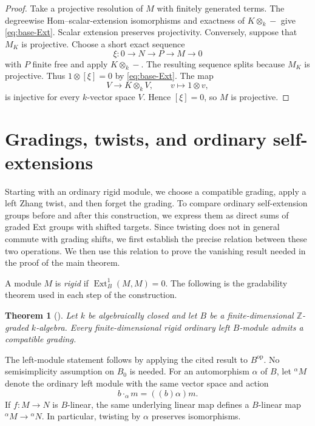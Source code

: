 \documentclass[11pt,a4paper]{article}
\numberwithin{equation}{section}
\theoremstyle{definition}
\theoremstyle{plain}
\newtheorem{theorem}[definition]{Theorem}
\theoremstyle{remark}
\DeclareMathOperator{\Ext}{Ext}
\newcommand{\Z}{\mathbb Z}
\newcommand{\tw}[2]{{}^{#1}\!#2}
\begin{document}
\begin{proof}
Take a projective resolution of \(M\) with finitely generated terms.
The degreewise Hom--scalar-extension isomorphisms and exactness of
\(K\otimes_k-\) give \eqref{eq:base-Ext}. Scalar extension preserves
projectivity. Conversely, suppose that \(M_K\) is projective.
Choose a short exact sequence
\[
 \xi:0\longrightarrow N\longrightarrow P
 \longrightarrow M\longrightarrow0
\]
with \(P\) finite free and apply \(K\otimes_k-\).
The resulting sequence splits because \(M_K\) is projective.
Thus \(1\otimes[\xi]=0\) by \eqref{eq:base-Ext}.
The map
\[
 V\longrightarrow K\otimes_k V,
 \qquad v\longmapsto1\otimes v,
\]
is injective for every \(k\)-vector space \(V\).
Hence \([\xi]=0\), so \(M\) is projective.
\end{proof}

\section{Gradings, twists, and ordinary self-extensions}\label{sec:transport}

Starting with an ordinary rigid module, we choose a compatible grading, apply a left Zhang twist, and then forget the grading. To compare ordinary self-extension groups before and after this construction, we express them as direct sums of graded Ext groups with shifted targets. Since twisting does not in general commute with grading shifts, we first establish the precise relation between these two operations. We then use this relation to prove the vanishing result needed in the proof of the main theorem.

A module \(M\) is \emph{rigid} if \(\Ext_B^1(M,M)=0\).
The following is the gradability theorem used in each step of the
construction.

\begin{theorem}[{\cite[Corollary 4.5]{AO13}}]\label{thm:AO}
Let \(k\) be algebraically closed and let \(B\) be a finite-dimensional
\(\Z\)-graded \(k\)-algebra. Every finite-dimensional rigid ordinary
left \(B\)-module admits a compatible grading.
\end{theorem}

The left-module statement follows by applying the cited result to
\(B^{\mathrm{op}}\). No semisimplicity assumption on \(B_0\) is needed.
For an automorphism \(\alpha\) of \(B\), let \(\tw{\alpha}{M}\) denote
the ordinary left module with the same vector space and action
\begin{equation*}
 b\cdot_\alpha m=((b)\alpha)m.
\end{equation*}
If \(f:M\to N\) is \(B\)-linear, the same underlying linear map
defines a \(B\)-linear map
\(\tw{\alpha}{M}\to\tw{\alpha}{N}\).
In particular, twisting by \(\alpha\) preserves isomorphisms.
\end{document}
